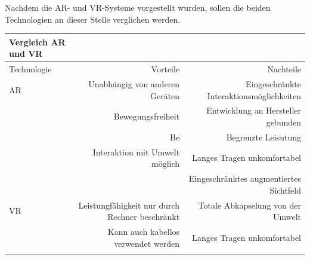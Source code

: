 Nachdem die AR- und VR-Systeme vorgestellt wurden, sollen die beiden Technologien an dieser Stelle verglichen werden.

\begin{tabular}{lrr} 
\toprule
Vergleich AR und VR\\  
\midrule 
Technologie & Vorteile & Nachteile\\ 
\midrule 
AR & Unabhängig von anderen Geräten & Eingeschränkte Interaktionsmöglichkeiten\\
   & Bewegungsfreiheit				& Entwicklung an Hersteller gebunden\\
   & Be								& Begrenzte Leisutung\\
   & Interaktion mit Umwelt möglich & Langes Tragen unkomfortabel\\
   & 								& Eingeschränktes augmentiertes Sichtfeld\\
VR & Leistungfähigkeit nur durch Rechner beschränkt  & Totale Abkapselung von der Umwelt \\
	& Kann auch kabellos verwendet werden		  	 & Langes Tragen unkomfortabel\\
	& & \\
\bottomrule
\end{tabular}






